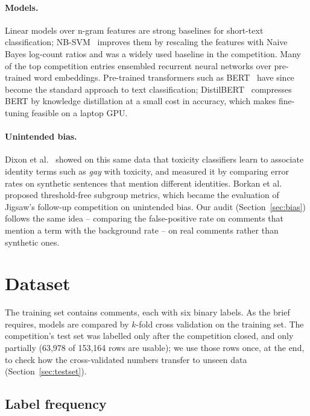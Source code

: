 \documentclass[11pt,a4paper]{article}
\begin{document}
\paragraph{Models.}  Linear models over n-gram features are strong baselines
for short-text classification; NB-SVM~\cite{wang2012} improves them by
rescaling the features with Naive Bayes log-count ratios and was a widely
used baseline in the competition.  Many of the top competition entries
ensembled recurrent neural networks over pre-trained word embeddings.  Pre-trained
transformers such as BERT~\cite{devlin2019} have since become the standard
approach to text classification; DistilBERT~\cite{sanh2019} compresses BERT
by knowledge distillation at a small cost in accuracy, which makes
fine-tuning feasible on a laptop GPU.

\paragraph{Unintended bias.}  Dixon et al.~\cite{dixon2018} showed on this
same data that toxicity classifiers learn to associate identity terms such as
\emph{gay} with toxicity, and measured it by comparing error rates on
synthetic sentences that mention different identities.  Borkan et
al.~\cite{borkan2019} proposed threshold-free subgroup metrics, which became
the evaluation of Jigsaw's follow-up competition on unintended bias.  Our
audit (Section~\ref{sec:bias}) follows the same idea -- comparing the
false-positive rate on comments that mention a term with the background rate
-- on real comments rather than synthetic ones.

\section{Dataset}

The training set contains \NComments{} comments, each with six binary labels.
As the brief requires, models are compared by $k$-fold cross validation on the
training set.  The competition's test set was labelled only after the
competition closed, and only partially (63,978 of 153,164 rows are usable); we
use those rows once, at the end, to check how the cross-validated numbers
transfer to unseen data (Section~\ref{sec:testset}).

\subsection{Label frequency}
\end{document}
